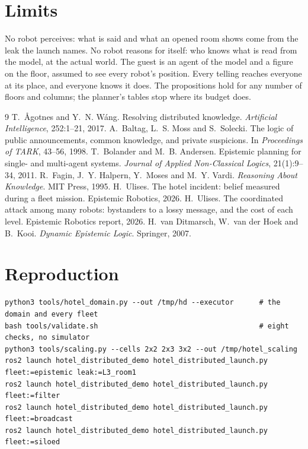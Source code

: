 \documentclass[11pt,a4paper]{article}
\theoremstyle{definition}
\begin{document}
\section{Limits}
\label{sec:limits}

No robot perceives: what is said and what an opened room shows come from the
leak the launch names. No robot reasons for itself: who knows what is read from
the model, at the actual world. The guest is an agent of the model and a figure
on the floor, assumed to see every robot's position. Every telling reaches
everyone at its place, and everyone knows it does. The propositions hold for any
number of floors and columns; the planner's tables stop where its budget does.

\begin{thebibliography}{9}
 T.~\AA{}gotnes and Y.~N. W\'ang.
  Resolving distributed knowledge.
  \emph{Artificial Intelligence}, 252:1--21, 2017.
 A.~Baltag, L.~S. Moss and S.~Solecki.
  The logic of public announcements, common knowledge, and private suspicions.
  In \emph{Proceedings of TARK}, 43--56, 1998.
 T.~Bolander and M.~B. Andersen.
  Epistemic planning for single- and multi-agent systems.
  \emph{Journal of Applied Non-Classical Logics}, 21(1):9--34, 2011.
 R.~Fagin, J.~Y. Halpern, Y.~Moses and M.~Y. Vardi.
  \emph{Reasoning About Knowledge}. MIT Press, 1995.
 H.~Ulises.
  The hotel incident: belief measured during a fleet mission.
  Epistemic Robotics, 2026.
 H.~Ulises.
  The coordinated attack among many robots: bystanders to a lossy message, and
  the cost of each level. Epistemic Robotics report, 2026.
 H.~van Ditmarsch, W.~van der Hoek and B.~Kooi.
  \emph{Dynamic Epistemic Logic}. Springer, 2007.
\end{thebibliography}

\section*{Reproduction}

\begin{lstlisting}
python3 tools/hotel_domain.py --out /tmp/hd --executor      # the domain and every fleet
bash tools/validate.sh                                      # eight checks, no simulator
python3 tools/scaling.py --cells 2x2 2x3 3x2 --out /tmp/hotel_scaling
ros2 launch hotel_distributed_demo hotel_distributed_launch.py fleet:=epistemic leak:=L3_room1
ros2 launch hotel_distributed_demo hotel_distributed_launch.py fleet:=filter
ros2 launch hotel_distributed_demo hotel_distributed_launch.py fleet:=broadcast
ros2 launch hotel_distributed_demo hotel_distributed_launch.py fleet:=siloed
\end{lstlisting}
\end{document}
